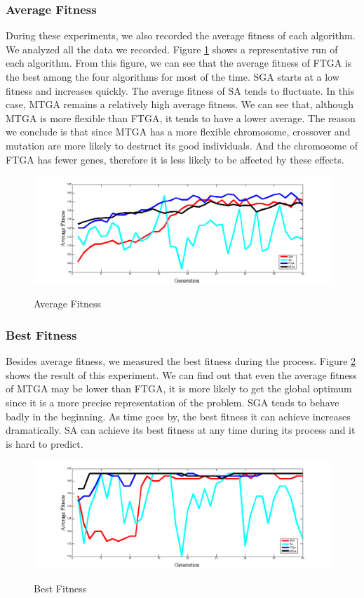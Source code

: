 \documentclass{article} %
\begin{document}
\subsubsection{Average Fitness}
During these experiments, we also recorded the average fitness of each algorithm. We analyzed all the data we recorded. Figure \ref{fig:avg_fitness} shows a representative run of each algorithm. From this figure, we can see that the average fitness of FTGA is the best among the four algorithms for most of the time. SGA starts at a low fitness and increases quickly. The average fitness of SA tends to fluctuate. In this case, MTGA remains a relatively high average fitness. We can see that, although MTGA is more flexible than FTGA, it tends to have a lower average. The reason we conclude is that since MTGA has a more flexible chromosome, crossover and mutation are more likely to destruct its good individuals. And the chromosome of FTGA has fewer genes, therefore it is less likely to be affected by these effects.

\begin{figure}[htbp]
\centering
\includegraphics[width=\textwidth]{images/exp/avg_fitness.png}
\label{fig:avg_fitness}
\caption{Average Fitness}
\end{figure}

\subsubsection{Best Fitness}
Besides average fitness, we measured the best fitness during the process. Figure \ref{fig:best_fitness} shows the result of this experiment. We can find out that even the average fitness of MTGA may be lower than FTGA, it is more likely to get the global optimum since it is a more precise representation of the problem. SGA tends to behave badly in the beginning. As time goes by, the best fitness it can achieve increases dramatically. SA can achieve its best fitness at any time during its process and it is hard to predict. 

\begin{figure}[h]
\centering
\includegraphics[width=\textwidth]{images/exp/best_all.png}
\label{fig:best_fitness}
\caption{Best Fitness}
\end{figure}
\end{document}
